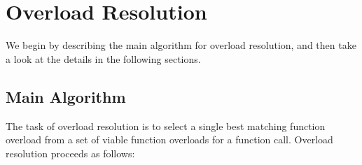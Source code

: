 \documentclass[a4paper,oneside,11pt]{book}
\theoremstyle{definition}
\begin{document}
\chapter{Overload Resolution}\label{overloadresolution}

We begin by describing the main algorithm for overload resolution, and then take a look at the details in the following sections.

\section{Main Algorithm}

The task of overload resolution is to select a single best matching function overload from a set of viable function overloads for a function call.
Overload resolution proceeds as follows:
\end{document}
